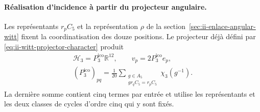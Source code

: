 \paragraph{Réalisation d’incidence à partir du projecteur angulaire.}
Les représentants \(r_pC_5\) et la représentation \(\rho\) de la
section~\ref{sec:ii-enlace-angular-witt} fixent la coordinatisation des douze
positions. Le projecteur déjà défini par
\eqref{eq:ii-witt-projector-character} produit
\begin{equation}
 \begin{gathered}
 \mathcal H_3=P_3^{\mathrm{ico}}\mathbb R^{12},\qquad v_p=2P_3^{\mathrm{ico}}e_p,
 \\[-2pt]
 (P_3^{\mathrm{ico}})_{pq}=\frac1{20}
 \sum_{\substack{g\in A_5\\gr_qC_5=r_pC_5}}\chi_3(g^{-1}).
 \end{gathered}
 \label{ii:dodeca:vertices-proyector}
\end{equation}
La dernière somme contient cinq termes par entrée et utilise les
représentants et les deux classes de cycles d’ordre cinq qui y sont fixés.

